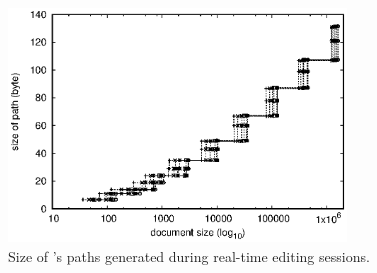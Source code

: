 \ \\

\begin{figure}
  \centering
  \includegraphics[width=0.8\textwidth]{./img/identifiers.eps}
  \caption{\label{fig:identifiers} Size of \LSEQ's paths generated during
    real-time editing sessions.}
\end{figure}

